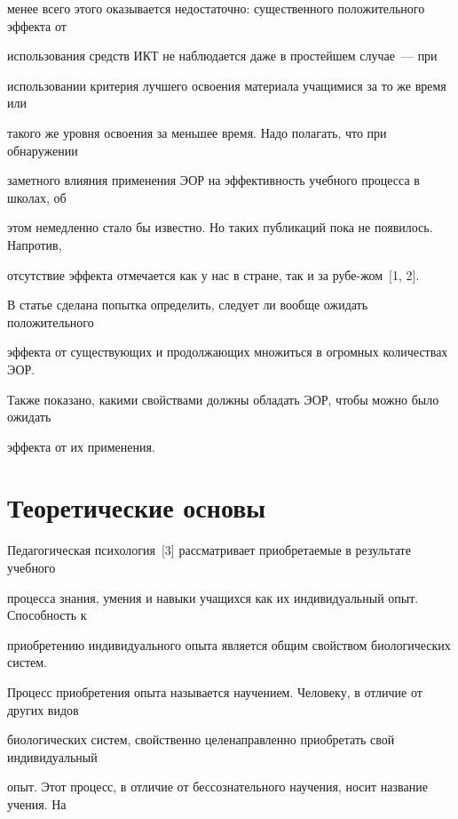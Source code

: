 менее всего этого оказывается недостаточно: существенного положительного эффекта от 


использования средств ИКТ не наблюдается даже в простейшем случае~--- при 


использовании критерия лучшего освоения материала учащимися за то же время или 


такого же уровня освоения за меньшее время. Надо полагать, что при обнаружении 


заметного влияния применения ЭОР на эффективность учебного процесса в школах, об 


этом немедленно стало бы известно. Но таких публикаций пока не появилось. Напротив, 


отсутствие эффекта отмечается как у нас в стране, так и за рубе-\linebreak жом~[1, 2].





В статье сделана попытка определить, следует ли вообще ожидать положительного 


эффекта от существующих и продолжающих множиться в огромных количествах ЭОР. 


Также показано, какими свойствами должны обладать ЭОР, чтобы можно было ожидать 


эффекта от их применения.








\section{Теоретические основы}





Педагогическая психология~[3] рассматривает приобретаемые в результате учебного 


процесса знания, умения и навыки учащихся как их индивидуальный опыт. Способность к 


приобретению индивидуального опыта является общим свойством биологических систем. 


Процесс приобретения опыта называется научением. Человеку, в отличие от других видов 


биологических систем, свойственно целенаправленно приобретать свой индивидуальный 


опыт. Этот процесс, в отличие от бессознательного научения, носит название учения. На 


